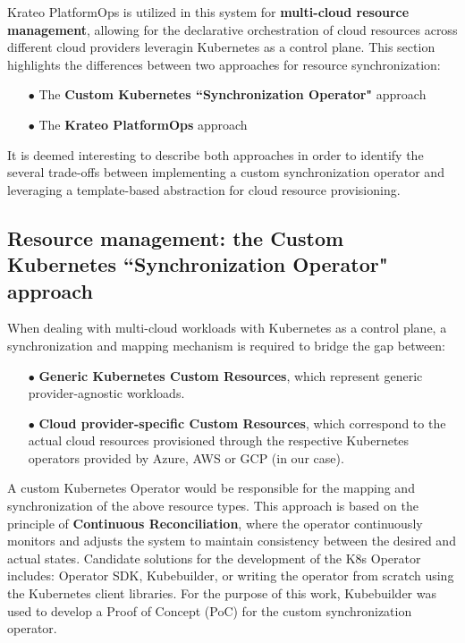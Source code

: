 Krateo PlatformOps is utilized in this system for \textbf{multi-cloud resource management}, allowing for the declarative orchestration of cloud resources across different cloud providers leveragin Kubernetes as a control plane. 
This section highlights the differences between two approaches for resource synchronization:
\begin{itemize}[itemsep=0.2pt, topsep=1pt]
  \item[$\bullet$] The \textbf{Custom Kubernetes ``Synchronization Operator"} approach
  \item[$\bullet$] The \textbf{Krateo PlatformOps} approach
\end{itemize}

It is deemed interesting to describe both approaches in order to identify the several trade-offs between implementing a custom synchronization operator and leveraging a template-based abstraction for cloud resource provisioning.

\subsection{Resource management: the Custom Kubernetes ``Synchronization Operator" approach}

When dealing with multi-cloud workloads with Kubernetes as a control plane, a synchronization and mapping mechanism is required to bridge the gap between:
\begin{itemize}[itemsep=0.2pt, topsep=1pt]
  \item[$\bullet$] \textbf{Generic Kubernetes Custom Resources}, which represent generic provider-agnostic workloads.
  \item[$\bullet$] \textbf{Cloud provider-specific Custom Resources}, which correspond to the actual cloud resources provisioned through the respective Kubernetes operators provided by Azure, AWS or GCP (in our case).
\end{itemize}

A custom Kubernetes Operator would be responsible for the mapping and synchronization of the above resource types. This approach is based on the principle of \textbf{Continuous Reconciliation}, where the operator continuously monitors and adjusts the system to maintain consistency between the desired and actual states.
Candidate solutions for the development of the K8s Operator includes: Operator SDK, Kubebuilder, or writing the operator from scratch using the Kubernetes client libraries. For the purpose of this work, Kubebuilder was used to develop a Proof of Concept (PoC) for the custom synchronization operator.

